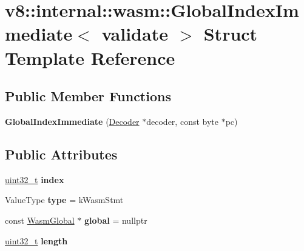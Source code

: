 \hypertarget{structv8_1_1internal_1_1wasm_1_1GlobalIndexImmediate}{}\section{v8\+:\+:internal\+:\+:wasm\+:\+:Global\+Index\+Immediate$<$ validate $>$ Struct Template Reference}
\label{structv8_1_1internal_1_1wasm_1_1GlobalIndexImmediate}
\subsection*{Public Member Functions}
\begin{DoxyCompactItemize}
\item 
\mbox{\label{structv8_1_1internal_1_1wasm_1_1GlobalIndexImmediate_aa6bf6e966159132e050ebebb3e080dce}} 
{\bfseries Global\+Index\+Immediate} (\mbox{\hyperlink{classv8_1_1internal_1_1wasm_1_1Decoder}{Decoder}} $\ast$decoder, const byte $\ast$pc)
\end{DoxyCompactItemize}
\subsection*{Public Attributes}
\begin{DoxyCompactItemize}
\item 
\mbox{\label{structv8_1_1internal_1_1wasm_1_1GlobalIndexImmediate_a07f7d7b19fa83a3485c3a7d526bf7a5b}} 
\mbox{\hyperlink{classuint32__t}{uint32\+\_\+t}} {\bfseries index}
\item 
\mbox{\label{structv8_1_1internal_1_1wasm_1_1GlobalIndexImmediate_ad48940fe344a874d2440758e07206fe5}} 
Value\+Type {\bfseries type} = k\+Wasm\+Stmt
\item 
\mbox{\label{structv8_1_1internal_1_1wasm_1_1GlobalIndexImmediate_a77eb9c20ae56c2683a3dc4fbd4703672}} 
const \mbox{\hyperlink{structv8_1_1internal_1_1wasm_1_1WasmGlobal}{Wasm\+Global}} $\ast$ {\bfseries global} = nullptr
\item 
\mbox{\label{structv8_1_1internal_1_1wasm_1_1GlobalIndexImmediate_a2fd7948dd83ef62d2f6e30c0dc6b6895}} 
\mbox{\hyperlink{classuint32__t}{uint32\+\_\+t}} {\bfseries length}
\end{DoxyCompactItemize}



